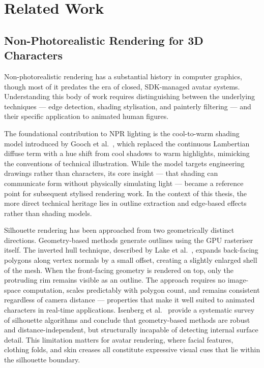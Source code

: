 \chapter{Related Work}
\label{ch:related_work}

\section{Non-Photorealistic Rendering for 3D Characters}
\label{sec:related_npr}

Non-photorealistic rendering has a substantial history in computer graphics, though most of it predates the era of closed, SDK-managed avatar systems. Understanding this body of work requires distinguishing between the underlying techniques — edge detection, shading stylisation, and painterly filtering — and their specific application to animated human figures.

The foundational contribution to NPR lighting is the cool-to-warm shading model introduced by Gooch et al.~\cite{gooch1998}, which replaced the continuous Lambertian diffuse term with a hue shift from cool shadows to warm highlights, mimicking the conventions of technical illustration. While the model targets engineering drawings rather than characters, its core insight — that shading can communicate form without physically simulating light — became a reference point for subsequent stylised rendering work. In the context of this thesis, the more direct technical heritage lies in outline extraction and edge-based effects rather than shading models.

Silhouette rendering has been approached from two geometrically distinct directions. Geometry-based methods generate outlines using the GPU rasteriser itself. The inverted hull technique, described by Lake et al.~\cite{lake2000}, expands back-facing polygons along vertex normals by a small offset, creating a slightly enlarged shell of the mesh. When the front-facing geometry is rendered on top, only the protruding rim remains visible as an outline. The approach requires no image-space computation, scales predictably with polygon count, and remains consistent regardless of camera distance — properties that make it well suited to animated characters in real-time applications. Isenberg et al.~\cite{isenberg2003} provide a systematic survey of silhouette algorithms and conclude that geometry-based methods are robust and distance-independent, but structurally incapable of detecting internal surface detail. This limitation matters for avatar rendering, where facial features, clothing folds, and skin creases all constitute expressive visual cues that lie within the silhouette boundary.

